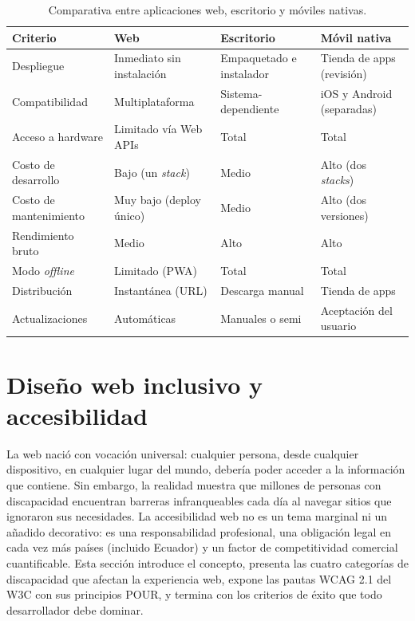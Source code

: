 \documentclass[11pt,a4paper,openany]{book}
\begin{document}
\begin{table}[htbp]
\centering
\caption{Comparativa entre aplicaciones web, escritorio y móviles nativas.}
\footnotesize
\begin{tabularx}{\textwidth}{lXXX}
\toprule
\textbf{Criterio} & \textbf{Web} & \textbf{Escritorio} & \textbf{Móvil nativa}\\
\midrule
Despliegue & Inmediato sin instalación & Empaquetado e instalador & Tienda de apps (revisión)\\
Compatibilidad & Multiplataforma & Sistema-dependiente & iOS y Android (separadas)\\
Acceso a hardware & Limitado vía Web APIs & Total & Total\\
Costo de desarrollo & Bajo (un \emph{stack}) & Medio & Alto (dos \emph{stacks})\\
Costo de mantenimiento & Muy bajo (deploy único) & Medio & Alto (dos versiones)\\
Rendimiento bruto & Medio & Alto & Alto\\
Modo \emph{offline} & Limitado (PWA) & Total & Total\\
Distribución & Instantánea (URL) & Descarga manual & Tienda de apps\\
Actualizaciones & Automáticas & Manuales o semi & Aceptación del usuario\\
\bottomrule
\end{tabularx}
\end{table}

\section{Diseño web inclusivo y accesibilidad}

La web nació con vocación universal: cualquier persona, desde
cualquier dispositivo, en cualquier lugar del mundo, debería poder
acceder a la información que contiene. Sin embargo, la realidad
muestra que millones de personas con discapacidad encuentran
barreras infranqueables cada día al navegar sitios que ignoraron sus
necesidades. La accesibilidad web no es un tema marginal ni un
añadido decorativo: es una responsabilidad profesional, una
obligación legal en cada vez más países (incluido Ecuador) y un
factor de competitividad comercial cuantificable. Esta sección
introduce el concepto, presenta las cuatro categorías de
discapacidad que afectan la experiencia web, expone las pautas WCAG
2.1 del W3C con sus principios POUR, y termina con los criterios de
éxito que todo desarrollador debe dominar.
\end{document}
